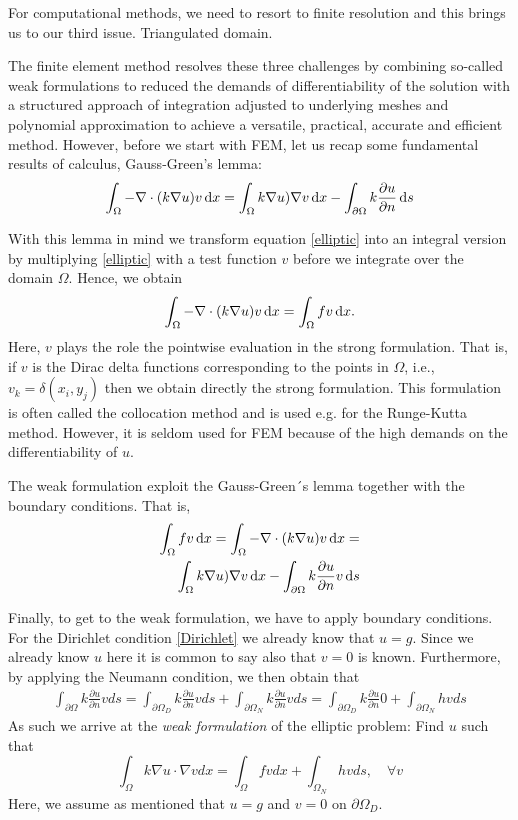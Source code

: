 For computational methods, we need to resort to finite resolution and this brings us to our third 
issue. Triangulated domain. 

The finite element method resolves these three challenges by combining so-called weak formulations
to reduced the demands of differentiability of the solution with a structured approach of integration
adjusted to underlying meshes and polynomial approximation to achieve a versatile, practical, accurate
and efficient method. However, before we start with FEM, let us recap some fundamental results of calculus, 
Gauss-Green's lemma: 
\begin{equation}
\label{gaussgreen}
\int_\Omega 
-\nabla\cdot(k\nabla u) v \, \mathrm{d}x =  
\int_\Omega k\nabla u) \nabla v \, \mathrm{d}x  - \int_{\partial \Omega} k\frac{\partial u} {\partial n} \, \mathrm{d}s 
\end{equation}

With this lemma in mind we transform equation \eqref{elliptic} into an integral version by multiplying
\eqref{elliptic} with a test function $v$ before we integrate over the domain $\Omega$. Hence, 
we obtain  
\begin{equation}
\label{gaussgreen}
\int_\Omega -\nabla\cdot(k\nabla u) v \, \mathrm{d}x =  \int_\Omega f v \, \mathrm{d}x .  
\end{equation}
Here, $v$ plays the role the pointwise evaluation in the strong formulation. That is, 
if $v$ is the Dirac delta functions corresponding to the points in $\Omega$, i.e.,  $v_k = \delta(x_i, y_j)$
then we obtain directly the strong formulation. This formulation is often called
the collocation method and is used e.g. for the Runge-Kutta method. However, it is 
seldom used for FEM because of the high demands on the differentiability of $u$. 

The weak formulation exploit the Gauss-Green´s lemma together with the boundary conditions. That is,  
\begin{eqnarray*}
\label{gaussgreen}
\int_\Omega f v \, \mathrm{d}x =   \int_\Omega -\nabla\cdot(k\nabla u) v \, \mathrm{d}x =  \\ 
\int_\Omega k\nabla u) \nabla v \, \mathrm{d}x  - \int_{\partial \Omega} k\frac{\partial u} {\partial n} v \, \mathrm{d}s   
\end{eqnarray*}

Finally, to get to the weak formulation, we have to apply boundary conditions. For the Dirichlet
condition \eqref{Dirichlet} we already know that $u=g$. Since we already know $u$ here it is common 
to say also that $v=0$ is known. Furthermore, by applying the Neumann condition, we then obtain that  
\begin{eqnarray}
\int_{\partial \Omega} k\frac{\partial u} {\partial n} v ds =   
\int_{\partial \Omega_D} k\frac{\partial u} {\partial n} v ds +   \int_{\partial \Omega_N} k\frac{\partial u} {\partial n} v ds =   
\int_{\partial \Omega_D} k\frac{\partial u} {\partial n} 0 +   \int_{\partial \Omega_N} h v ds   
\end{eqnarray}
As such we arrive at the \emph{weak formulation} of the elliptic problem: 
Find $u$ such that 
\[
\int_\Omega k \nabla u \cdot \nabla v dx = \int_\Omega f v dx + \int_{\Omega_N} h v ds, \quad \forall v  
\]
Here, we assume as mentioned that $u=g$ and $v=0$ on $\partial \Omega_D$.  


